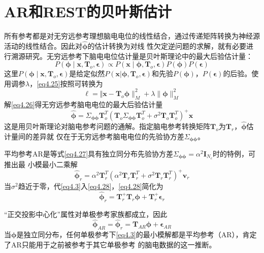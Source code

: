 \section{AR和REST的贝叶斯估计}
所有参考都是对无穷远参考理想脑电电位的线性结合，通过传递矩阵转换为神经源活动的线性结合。因此对$\hat{\mathbf{\phi}}$的估计转换为对线
性欠定逆问题的求解，就有必要进行溯源研究。无穷远参考下脑电电位估计量是贝叶斯理论中的最大后验估计量：
\begin{equation}\label{eq4.25}
P(\mathbf{\phi}\mid\mathbf{x},\mathbf{T}_o,\mathbf{\epsilon})\propto{P(\mathbf{x}\mid\mathbf{\phi},\mathbf{T}_o,\mathbf{\epsilon})P(\mathbf{\phi})P(\mathbf{\epsilon})}
\end{equation}
这里$P(\mathbf{\phi}\mid\mathbf{x},\mathbf{T}_o,\mathbf{\epsilon})$是给定似然$P(\mathbf{x}|\mathbf{\phi},\mathbf{T}_o,\mathbf{\epsilon})$和先验$P(\mathbf{\phi})$，$P(\mathbf{\epsilon})$的后验。使用调参$\lambda$，\eqref{eq4.25}按照\cite{noauthor_mardia_nodate}可转换为
\begin{equation}\label{eq4.26}
\ell = \Vert\mathbf{x}-\mathbf{T}_o\mathbf{\phi}\rVert_M^2+\lambda\lVert\mathbf{\phi}\rVert_M^2
\end{equation}
解\eqref{eq4.26}得无穷远参考脑电电位的最大后验估计量
\begin{equation}\label{eq4.27}
\hat{\mathbf{\phi}}=\Sigma_\mathbf{\phi\phi}\mathbf{T}_o^T(\mathbf{T}_o\Sigma_\mathbf{\phi\phi}\mathbf{T}_o^T+\sigma^2\mathbf{T}_o\mathbf{T}_o^T)^+\mathbf{x}
\end{equation}
这是用贝叶斯理论对脑电参考问题的通解。指定脑电参考转换矩阵$\mathbf{T}_o$为$\mathbf{T}_r$，$\hat{\mathbf{\phi}}$估计量间的差异就
仅在于无穷远参考脑电电位的先验协方差$\Sigma_{\mathbf{\phi\phi}}$。

平均参考AR是等式\eqref{eq4.27}具有独立同分布先验协方差$\Sigma_{\mathbf{\phi\phi}}=\alpha^2\mathbf{I}_{N_c}$时的特例，可推出最
小模最小二乘解
\begin{equation}\label{eq4.28}
\hat{\mathbf{\phi}}_r=\alpha^2\mathbf{T}_r^T(\alpha^2\mathbf{T}_r\mathbf{T}_r^T+\sigma^2\mathbf{T}_r\mathbf{T}_r^T)^+\mathbf{v}_r
\end{equation}
当$\sigma^2$趋近于零，代\eqref{eq4.3}入\eqref{eq4.28}，\eqref{eq4.28}简化为
\begin{equation}\label{eq4.29}
\hat{\mathbf{\phi}}_r=\mathbf{T}_r^+\mathbf{T}_r\mathbf{\phi}+\mathbf{T}_r^+\mathbf{\epsilon}_r
\end{equation}

“正交投影中心化”属性对单极参考家族都成立，因此
\begin{equation}\label{eq4.30}
\hat{\mathbf{\phi}}_{AR}=\hat{\mathbf{\phi}}_r=\mathbf{T}_{AR}\mathbf{\phi}+\mathbf{\epsilon}_{AR}
\end{equation}
当$\mathbf{\phi}$是独立同分布，任何单极参考下\eqref{eq4.3}的最小模解都是平均参考（AR），肯定了AR只能用于之前被参考于其它单极参考
的脑电数据的这一推断。

